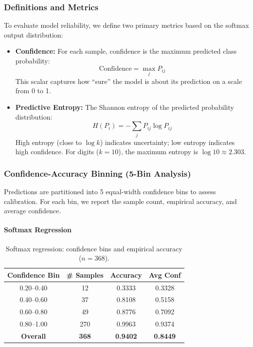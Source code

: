 \documentclass[sigconf,screen,nonacm]{acmart}
\begin{document}
\subsubsection{Definitions and Metrics}
To evaluate model reliability, we define two primary metrics based on the softmax output distribution:

\begin{itemize}
    \item \textbf{Confidence:} For each sample, confidence is the maximum predicted class probability:
    \[
    \text{Confidence} = \max_j P_{ij}
    \]
    This scalar captures how ``sure'' the model is about its prediction on a scale from 0 to 1.

    \item \textbf{Predictive Entropy:} The Shannon entropy of the predicted probability distribution:
    \[
    H(P_i) = -\sum_j P_{ij} \log P_{ij}
    \]
    High entropy (close to $\log k$) indicates uncertainty; low entropy indicates high confidence. For digits ($k=10$), the maximum entropy is $\log 10 \approx 2.303$.
\end{itemize}

\subsubsection{Confidence-Accuracy Binning (5-Bin Analysis)}
Predictions are partitioned into 5 equal-width confidence bins to assess calibration. For each bin, we report the sample count, empirical accuracy, and average confidence.



\paragraph{Softmax Regression}
\begin{table}[htbp]
    \centering
    \caption{Softmax regression: confidence bins and empirical accuracy ($n=368$).}
    \label{tab:conf-bins-softmax}
    \begin{tabular}{cccc}
        \toprule
        Confidence Bin & \# Samples & Accuracy & Avg Conf \\
        \midrule
        0.20--0.40 & 12 & 0.3333 & 0.3328 \\
        0.40--0.60 & 37 & 0.8108 & 0.5158 \\
        0.60--0.80 & 49 & 0.8776 & 0.7092 \\
        0.80--1.00 & 270 & 0.9963 & 0.9374 \\
        \midrule
        \textbf{Overall} & \textbf{368} & \textbf{0.9402} & \textbf{0.8449} \\
        \bottomrule
    \end{tabular}
\end{table}
\end{document}
